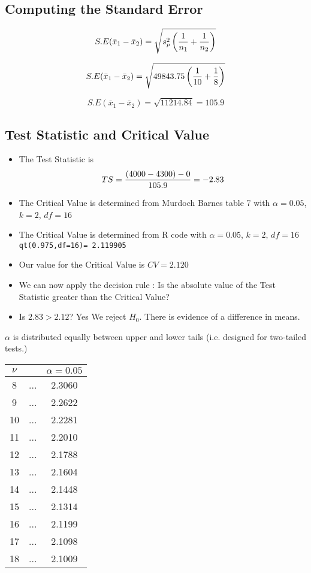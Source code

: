 \documentclass[a4paper,12pt]{article}
\begin{document}
\medskip 

\subsection*{Computing the Standard Error}
\[ S.E(\bar{x}_1 - \bar{x}_2) = \sqrt{s^2_p \left({1\over n_1}+{1\over n_2} \right)}\]

\[ S.E(\bar{x}_1 - \bar{x}_2) = \sqrt{49843.75 \left({1\over 10}+{1\over 8} \right)}\]

\[ S.E(\bar{x}_1 - \bar{x}_2) = \sqrt{11214.84} = 105.9\]

\medskip 


\subsection*{Test Statistic and Critical Value}
\begin{itemize}
\item The Test Statistic is \[ TS  = {(4000-4300) - 0 \over 105.9}  = -2.83 \]
\item The Critical Value is determined from Murdoch Barnes table 7 with $\alpha = 0.05$, $k=2$, $df = 16 $
\item The Critical Value is determined from R code with $\alpha = 0.05$, $k=2$, $df = 16 $ \texttt{qt(0.975,df=16)=  2.119905}
\item Our value for the Critical Value is $CV = 2.120$
\item We can now apply the decision rule : Is the absolute value of the Test Statistic greater than the Critical Value?
\item Is $2.83 > 2.12$? Yes We reject $H_0$. There is evidence of a difference in means.
\end{itemize}
\medskip 



\begin{framed}

$\alpha$ is distributed equally between upper and lower tails (i.e. designed for two-tailed tests.)
\begin{center}
\begin{tabular}{c|cc}
$\nu$ & & $\alpha = 0.05$ \\ \hline
8&...&2.3060\\ \hline
9&...&2.2622\\ \hline
10&...&2.2281\\ \hline
11&...&2.2010\\ \hline
12&...&2.1788\\ \hline
13&...&2.1604\\ \hline
14&...&2.1448\\ \hline
15&...&2.1314\\ \hline
16&...&2.1199\\ \hline
17&...&2.1098\\ \hline
18&...&2.1009\\ \hline
\end{tabular}
\end{center}
\end{framed}
\newpage 
\end{document}
